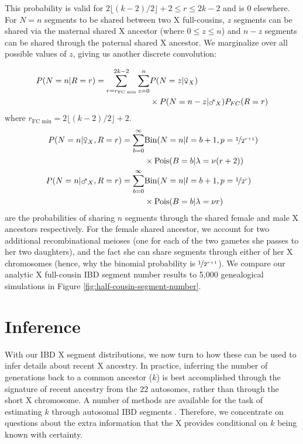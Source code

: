 \documentclass[9pt,twocolumn,twoside]{gsajnl}
\newcommand{\msxa}{\mars_X}
\newcommand{\fsxa}{\venus_X}
\begin{document}
This probability is valid for $2\lfloor (k-2)/2 \rfloor + 2 \le r \le 2k-2$ and
is 0 elsewhere. For $N=n$ segments to be shared between two X full-cousins, $z$
segments can be shared via the maternal shared X ancestor (where $0 \le z \le n$)
and $n-z$ segments can be shared through the paternal shared X ancestor. We
marginalize over all possible values of $z$, giving us another discrete
convolution:

\begin{align}
  \label{eq:prob-n-full-sibs}
  P(N = n | R=r) = \sum_{r=r_\text{FC min}}^{2k-2} \sum_{z=0}^{n} & P(N = z | \fsxa) \\ \nonumber
  & \times P(N = n - z | \msxa) P_{FC}(R=r)
\end{align}
%
where $r_\text{FC min} = 2\lfloor (k-2)/2\rfloor + 2$.
%
\begin{align}
  P(N = n | \fsxa, R=r) = \sum_{b=0}^\infty & \text{Bin}(N=n | l = b+1, p=\nicefrac{1}{2^{r+1}}) \\ \nonumber
  &\times \text{Pois}(B=b | \lambda = \nu (r+2)) \\
  P(N = n | \msxa, R=r) = \sum_{b=0}^\infty & \text{Bin}(N=n | l = b+1, p=\nicefrac{1}{2^r}) \\ \nonumber 
  &\times \text{Pois}(B=b | \lambda = \nu r) 
\end{align}
%
are the probabilities of sharing $n$ segments through the shared female and
male X ancestors respectively. For the female shared ancestor, we account for
two additional recombinational meioses (one for each of the two gametes she
passes to her two daughters), and the fact she can share segments through
either of her X chromosomes (hence, why the binomial probability is
$\nicefrac{1}{2^{r+1}}$). We compare our analytic X full-cousin IBD segment
number results to 5,000 genealogical simulations in Figure
\ref{fig:half-cousin-segment-number}.

\section*{Inference}
\label{sec:inf}

With our IBD X segment distributions, we now turn to how these can be used to
infer details about recent X ancestry. In practice, inferring the number of
generations back to a common ancestor ($k$) is best accomplished through the
signature of recent ancestry from the 22 autosomes, rather than through the
short X chromosome. A number of methods are available for the task of
estimating $k$ through autosomal IBD segments
\citep{Huff:2011eg,Henn:2012ij,Durand010512}.  Therefore, we concentrate on
questions about the extra information that the X provides conditional on $k$
being known with certainty. 
\end{document}
